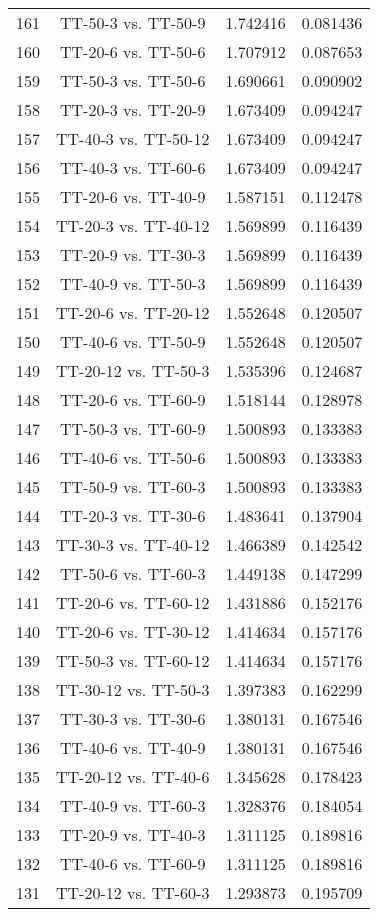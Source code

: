 \documentclass[a4paper,10pt]{article}
\begin{document}
\begin{landscape}
\begin{table}[!htp]
\begin{tabular}{cccc}
161&TT-50-3 vs. TT-50-9&1.742416&0.081436\\
160&TT-20-6 vs. TT-50-6&1.707912&0.087653\\
159&TT-50-3 vs. TT-50-6&1.690661&0.090902\\
158&TT-20-3 vs. TT-20-9&1.673409&0.094247\\
157&TT-40-3 vs. TT-50-12&1.673409&0.094247\\
156&TT-40-3 vs. TT-60-6&1.673409&0.094247\\
155&TT-20-6 vs. TT-40-9&1.587151&0.112478\\
154&TT-20-3 vs. TT-40-12&1.569899&0.116439\\
153&TT-20-9 vs. TT-30-3&1.569899&0.116439\\
152&TT-40-9 vs. TT-50-3&1.569899&0.116439\\
151&TT-20-6 vs. TT-20-12&1.552648&0.120507\\
150&TT-40-6 vs. TT-50-9&1.552648&0.120507\\
149&TT-20-12 vs. TT-50-3&1.535396&0.124687\\
148&TT-20-6 vs. TT-60-9&1.518144&0.128978\\
147&TT-50-3 vs. TT-60-9&1.500893&0.133383\\
146&TT-40-6 vs. TT-50-6&1.500893&0.133383\\
145&TT-50-9 vs. TT-60-3&1.500893&0.133383\\
144&TT-20-3 vs. TT-30-6&1.483641&0.137904\\
143&TT-30-3 vs. TT-40-12&1.466389&0.142542\\
142&TT-50-6 vs. TT-60-3&1.449138&0.147299\\
141&TT-20-6 vs. TT-60-12&1.431886&0.152176\\
140&TT-20-6 vs. TT-30-12&1.414634&0.157176\\
139&TT-50-3 vs. TT-60-12&1.414634&0.157176\\
138&TT-30-12 vs. TT-50-3&1.397383&0.162299\\
137&TT-30-3 vs. TT-30-6&1.380131&0.167546\\
136&TT-40-6 vs. TT-40-9&1.380131&0.167546\\
135&TT-20-12 vs. TT-40-6&1.345628&0.178423\\
134&TT-40-9 vs. TT-60-3&1.328376&0.184054\\
133&TT-20-9 vs. TT-40-3&1.311125&0.189816\\
132&TT-40-6 vs. TT-60-9&1.311125&0.189816\\
131&TT-20-12 vs. TT-60-3&1.293873&0.195709\\

\end{tabular}
\end{table}
\end{landscape}
\end{document}
